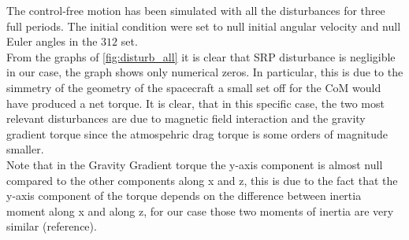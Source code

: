 The control-free motion has been simulated with all the disturbances for three full periods. 
The initial condition were set to null initial angular velocity and 
null Euler angles in the $312$ set. \\
From the graphs of \autoref{fig:disturb_all} it is clear that SRP disturbance is negligible
in our case, the graph shows only numerical zeros. In particular, this is due to the simmetry of 
the geometry of the spacecraft a small set off for the CoM would have produced a net torque. 
It is clear, that in this specific case, the two most relevant disturbances are due to magnetic field
interaction and the gravity gradient torque since the atmospehric drag torque is some orders of magnitude 
smaller. \\
Note that in the Gravity Gradient torque the y-axis component is almost null compared to the other 
components along x and z, this is due to the fact that the y-axis component of the torque depends on 
the difference between inertia moment along x and along z, for our case those two moments of inertia are 
very similar (reference). 